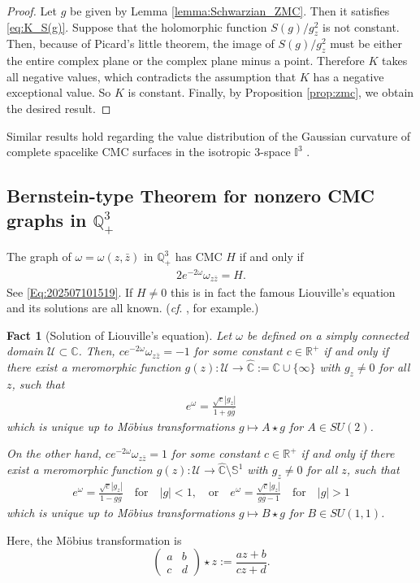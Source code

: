 \documentclass[12pt,reqno]{amsart}
\theoremstyle{plain} %
\newtheorem{fact}[theorem]{Fact}
\theoremstyle{definition}
\numberwithin{equation}{section}
\newcommand{\qthreep}{\mathbb{Q}^3_+}
\newcommand{\h}{H}%
\begin{document}
\begin{proof}
	Let $g$ be given by Lemma \ref{lemma:Schwarzian_ZMC}.
	Then it satisfies \eqref{eq:K_S(g)}.
	Suppose that the holomorphic function $S(g)/g_z^2$ is not constant. Then, because of Picard's little theorem, the image of $S(g)/g_z^2$ must be either the entire complex plane or the complex plane minus a point. Therefore $K$ takes all negative values, which contradicts the assumption that $K$ has a negative exceptional value. So $K$ is constant. Finally, by Proposition \ref{prop:zmc}, we obtain the desired result.
\end{proof}
Similar results hold regarding the value distribution of the Gaussian curvature of complete spacelike CMC surfaces in the isotropic $3$-space $\mathbb{I}^3$ \cite{ALY1}.

\subsection{Bernstein-type Theorem for nonzero CMC graphs in $\mathbb{Q}^3_+$}
The graph of $\omega = \omega(z, \bar{z})$ in $\qthreep$ has CMC $\h$ if and only if
\begin{align}\label{Eq:202507101527}
	2 e^{-2\omega} \omega_{z\bar{z}}= \h .
\end{align}
See \eqref{Eq:202507101519}. If $\h \not= 0$ this is in fact the famous Liouville's equation and its solutions are all known. (\textit{cf}. \cite{BHL}, \cite{Liouville} for example.)

\begin{fact}[Solution of Liouville's equation]\label{Liouville}
	Let $\omega$ be defined on a simply connected domain $\mathcal{U}\subset\mathbb{C}$.
	Then,
	$ce^{-2\omega}\omega_{z\bar{z}}=-1$  for some constant  $c\in\mathbb{R}^+$
	if and only if
	there exist a meromorphic function
	$g(z):\mathcal{U}\to\hat{\mathbb{C}}:=\mathbb{C}  \cup \{\infty\}$ with $g_z\ne0$ for all $z$, such that
	\begin{align}\label{Eq:202507202002}
		e^{\omega}= \frac{\sqrt{c}|g_z|}{1+g\bar{g}}
	\end{align}
	which is unique up to M\"obius transformations $ g \mapsto  A \star g$ for $A \in SU(2)$.

	On the other hand,
	$ce^{-2\omega}\omega_{z\bar{z}}=1$ for some constant $c\in\mathbb{R}^+$
	if and only if there exist a meromorphic function $g(z):\mathcal{U}\to\hat{\mathbb{C}}\setminus\mathbb{S}^1$ with $g_z\ne0$ for all $z$, such that
	\begin{align}\label{Eq:202507202003}
		e^{\omega}= \frac{\sqrt{c}|g_z|}{1-g\bar{g}} \quad \text{for}\quad |g|<1, \quad \text{or}\quad e^{\omega}= \frac{\sqrt{c}|g_z|}{g\bar{g}-1}\quad \text{for}\quad |g|>1
	\end{align}
	which is unique up to M\"obius transformations $g \mapsto B \star g$ for $B \in SU(1,1)$.
\end{fact}
Here, the M\"obius transformation is
$$
	\begin{pmatrix} a & b \\ c & d \end{pmatrix} \star z := \frac{a z + b}{ c z + d}.
$$
\end{document}
